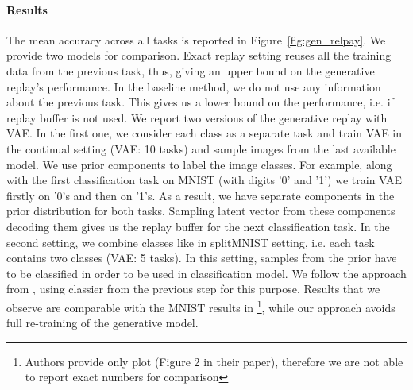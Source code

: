 \paragraph{Results} The mean accuracy across all tasks is reported in Figure~\ref{fig:gen_relpay}. We provide two models for comparison. Exact replay setting reuses all the training data from the previous task, thus, giving an upper bound on the generative replay's performance. In the baseline method, we do not use any information about the previous task. This gives us a lower bound on the performance, i.e. if replay buffer is not used.
We report two versions of the generative replay with VAE. In the first one, we consider each class as a separate task and train VAE in the continual setting (VAE: 10 tasks) and sample images from the last available model. We use prior components to label the image classes. For example, along with the first classification task on MNIST (with digits '0' and '1') we train VAE  firstly on '0's and then on '1's. As a result, we have separate components in the prior distribution for both tasks. Sampling latent vector from these components decoding them gives us the replay buffer for the next classification task. 
In the second setting, we combine classes like in splitMNIST setting, i.e. each task contains two classes (VAE: 5 tasks). In this setting, samples from the prior have to be classified in order to be used in classification model. We follow the approach from \citet{shin2017continual}, using classier from the previous step for this purpose.
Results that we observe are comparable with the MNIST results in \citet{shin2017continual}\footnote{Authors provide only plot (Figure 2 in their paper), therefore we are not able to report exact numbers for comparison}, while our approach avoids full re-training of the generative model.
